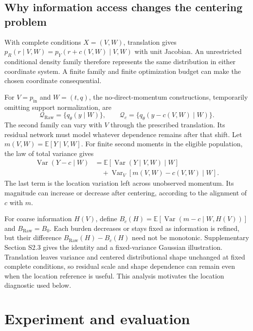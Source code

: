 \documentclass[twocolumn,epjc3]{svjour3}
\newcommand{\pin}{p_{\mathrm{in}}}
\newcommand{\raw}{\mathrm{Raw}}
\begin{document}
\subsection{Why information access changes the centering problem}

With complete conditions $X=(V,W)$, translation gives
$p_R(r\mid V,W)=p_Y(r+c(V,W)\mid V,W)$ with unit Jacobian. An unrestricted
conditional density family therefore represents the same distribution in
either coordinate system. A finite family and finite optimization budget
can make the chosen coordinate consequential.

For $V=\pin$ and $W=(t,q)$, the no-direct-momentum constructions, temporarily
omitting support normalization, are
\begin{equation}
 \mathcal Q_{\raw}=\{q_\theta(y\mid W)\},\qquad
 \mathcal Q_c=\{q_\theta(y-c(V,W)\mid W)\}.
\end{equation}
The second family can vary with $V$ through the prescribed translation.
Its residual network must model whatever dependence remains after that shift.
Let $m(V,W)=\mathbb E[Y\mid V,W]$. For finite second moments in the eligible
population, the law of total variance gives
\begin{align}
 \operatorname{Var}(Y-c\mid W)
 &= \mathbb E[\operatorname{Var}(Y\mid V,W)\mid W] \nonumber\\
 &\quad +\operatorname{Var}_V[m(V,W)-c(V,W)\mid W].
 \label{eq:location_burden}
\end{align}
The last term is the location variation left across unobserved momentum.
Its magnitude can increase or decrease after centering, according to the
alignment of $c$ with $m$.

For coarse information $H(V)$, define
$B_c(H)=\mathbb E[\operatorname{Var}(m-c\mid W,H(V))]$ and $B_{\raw}=B_0$.
Each burden decreases or stays fixed as information is refined, but their
difference $B_{\raw}(H)-B_c(H)$ need not be monotonic. Supplementary Section S2.3
gives the identity and a fixed-variance Gaussian illustration. Translation
leaves variance and centered distributional shape unchanged at fixed complete
conditions, so residual scale and shape dependence can remain even when the
location reference is useful. This analysis motivates the location diagnostic
used below.

\section{Experiment and evaluation}
\label{sec:experiment}
\end{document}
